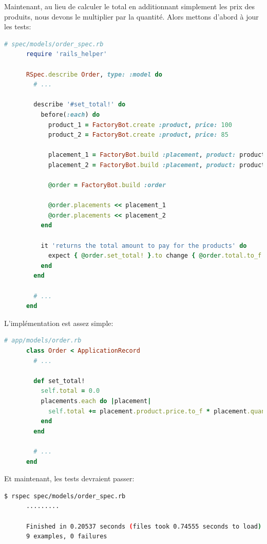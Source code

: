\documentclass[]{report}
\begin{document}
    Maintenant, au lieu de calculer le total en additionnant simplement les prix des produits, nous devons le multiplier par la quantité. Alors mettons d'abord à jour les tests:

    \begin{scriptsize}
      \begin{lstlisting}[language=ruby]
      # spec/models/order_spec.rb
      require 'rails_helper'

      RSpec.describe Order, type: :model do
        # ...

        describe '#set_total!' do
          before(:each) do
            product_1 = FactoryBot.create :product, price: 100
            product_2 = FactoryBot.create :product, price: 85

            placement_1 = FactoryBot.build :placement, product: product_1, quantity: 3
            placement_2 = FactoryBot.build :placement, product: product_2, quantity: 15

            @order = FactoryBot.build :order

            @order.placements << placement_1
            @order.placements << placement_2
          end

          it 'returns the total amount to pay for the products' do
            expect { @order.set_total! }.to change { @order.total.to_f }.from(0).to(1575)
          end
        end

        # ...
      end
      \end{lstlisting}
    \end{scriptsize}

    L'implémentation est assez simple:

    \begin{scriptsize}
      \begin{lstlisting}[language=ruby]
      # app/models/order.rb
      class Order < ApplicationRecord
        # ...

        def set_total!
          self.total = 0.0
          placements.each do |placement|
            self.total += placement.product.price.to_f * placement.quantity
          end
        end

        # ...
      end
      \end{lstlisting}
    \end{scriptsize}

    Et maintenant, les tests devraient passer:

    \begin{scriptsize}
      \begin{lstlisting}[language=bash]
      $ rspec spec/models/order_spec.rb
      .........

      Finished in 0.20537 seconds (files took 0.74555 seconds to load)
      9 examples, 0 failures
      \end{lstlisting}
    \end{scriptsize}
\end{document}
